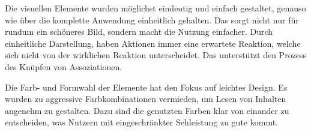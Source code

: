 Die visuellen Elemente wurden möglichst eindeutig und einfach gestaltet, genauso wie über die komplette Anwendung einheitlich gehalten. Das sorgt nicht nur für rundum ein schöneres Bild, sondern macht die Nutzung einfacher. Durch einheitliche Darstellung, haben Aktionen immer eine erwartete Reaktion, welche sich nicht von der wirklichen Reaktion unterscheidet. Das unterstützt den Prozess des Knüpfen von Assoziationen.

Die Farb- und Formwahl der Elemente hat den Fokus auf leichtes Design. Es wurden zu aggressive Farbkombinationen vermieden, um Lesen von Inhalten angenehm zu gestalten. Dazu sind die genutzten Farben klar von einander zu entscheiden, was Nutzern mit eingeschränkter Sehleistung zu gute kommt.
